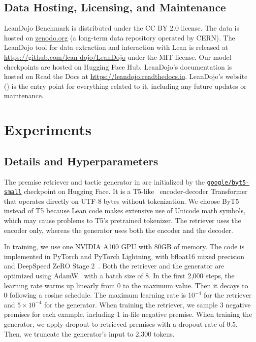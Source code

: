 \subsection{Data Hosting, Licensing, and Maintenance}
\label{appendix:hosting}

LeanDojo Benchmark is distributed under the CC BY 2.0 license. The data is hosted on \href{https://zenodo.org/}{zenodo.org} (a long-term data repository operated by CERN). The LeanDojo tool for data extraction and interaction with Lean is released at \url{https://github.com/lean-dojo/LeanDojo} 
under the MIT license. Our model checkpoints are hosted on Hugging Face Hub. LeanDojo's documentation is hosted on Read the Docs at \url{https://leandojo.readthedocs.io}. LeanDojo's website ({\weburl}) is the entry point for everything related to it, including any future updates or maintenance. 



\section{Experiments}

\subsection{Details and Hyperparameters}
\label{appendix:experimentaldetails}

The premise retriever and tactic generator in {\name} are initialized by the \href{https://huggingface.co/google/byt5-small}{\texttt{google/byt5-small}} checkpoint on Hugging Face. It is a T5-like~\cite{raffel2020exploring} encoder-decoder Transformer that operates directly on UTF-8 bytes without tokenization. We choose ByT5~\cite{xue2022byt5} instead of T5 because Lean code makes extensive use of Unicode math symbols, which may cause problems to T5's pretrained tokenizer. The retriever uses the encoder only, whereas the generator uses both the encoder and the decoder. 

In training, we use one NVIDIA A100 GPU with 80GB of memory. The code is implemented in PyTorch and PyTorch Lightning, with bfloat16 mixed precision and DeepSpeed ZeRO Stage 2~\cite{rasley2020deepspeed}. Both the retriever and the generator are optimized using AdamW~\cite{loshchilovdecoupled} with a batch size of 8. In the first 2,000 steps, the learning rate warms up linearly from 0 to the maximum value. Then it decays to 0 following a cosine schedule. The maximum learning rate is $10^{-4}$ for the retriever and $5 \times 10^{-4}$ for the generator. When training the retriever, we sample 3 negative premises for each example, including 1 in-file negative premise. When training the generator, we apply dropout to retrieved premises with a dropout rate of 0.5. Then, we truncate the generator's input to 2,300 tokens.

